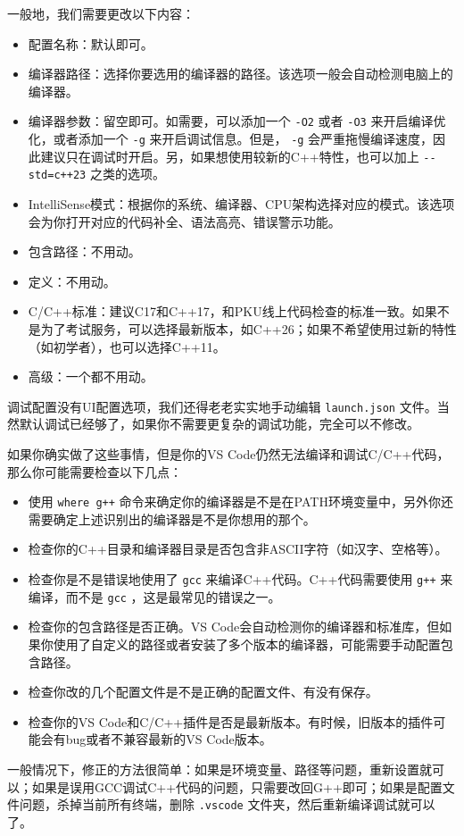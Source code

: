 一般地，我们需要更改以下内容：
\begin{itemize}
  \item 配置名称：默认即可。
  \item 编译器路径：选择你要选用的编译器的路径。该选项一般会自动检测电脑上的编译器。
  \item 编译器参数：留空即可。如需要，可以添加一个 \texttt{-O2} 或者 \texttt{-O3} 来开启编译优化，或者添加一个 \texttt{-g} 来开启调试信息。但是， \texttt{-g} 会严重拖慢编译速度，因此建议只在调试时开启。另，如果想使用较新的C++特性，也可以加上 \verb|--std=c++23| 之类的选项。
  \item IntelliSense模式：根据你的系统、编译器、CPU架构选择对应的模式。该选项会为你打开对应的代码补全、语法高亮、错误警示功能。
  \item 包含路径：不用动。
  \item 定义：不用动。
  \item C/C++标准：建议C17和C++17，和PKU线上代码检查的标准一致。如果不是为了考试服务，可以选择最新版本，如C++26；如果不希望使用过新的特性（如初学者），也可以选择C++11。
  \item 高级：一个都不用动。
\end{itemize}

调试配置没有UI配置选项，我们还得老老实实地手动编辑 \texttt{launch.json} 文件。当然默认调试已经够了，如果你不需要更复杂的调试功能，完全可以不修改。

如果你确实做了这些事情，但是你的VS Code仍然无法编译和调试C/C++代码，那么你可能需要检查以下几点：
\begin{itemize}
  \item 使用 \texttt{where g++} 命令来确定你的编译器是不是在PATH环境变量中，另外你还需要确定上述识别出的编译器是不是你想用的那个。
  \item 检查你的C++目录和编译器目录是否包含非ASCII字符（如汉字、空格等）。
  \item 检查你是不是错误地使用了 \texttt{gcc} 来编译C++代码。C++代码需要使用 \texttt{g++} 来编译，而不是 \texttt{gcc} ，这是最常见的错误之一。
  \item 检查你的包含路径是否正确。VS Code会自动检测你的编译器和标准库，但如果你使用了自定义的路径或者安装了多个版本的编译器，可能需要手动配置包含路径。
  \item 检查你改的几个配置文件是不是正确的配置文件、有没有保存。
  \item 检查你的VS Code和C/C++插件是否是最新版本。有时候，旧版本的插件可能会有bug或者不兼容最新的VS Code版本。
\end{itemize}
一般情况下，修正的方法很简单：如果是环境变量、路径等问题，重新设置就可以；如果是误用GCC调试C++代码的问题，只需要改回G++即可；如果是配置文件问题，杀掉当前所有终端，删除 \texttt{.vscode} 文件夹，然后重新编译调试就可以了。

